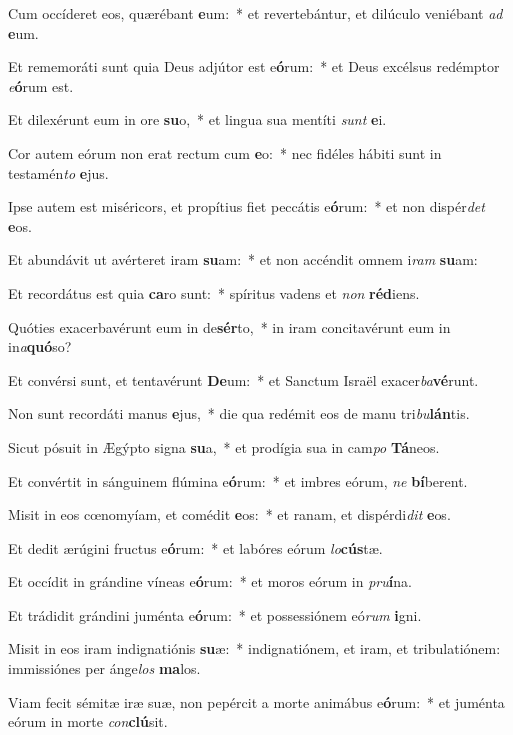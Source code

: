 \item Cum occíderet eos, quærébant \textbf{e}um:~* et revertebántur, et dilúculo veniébant \textit{ad} \textbf{e}um.
\item Et rememoráti sunt quia Deus adjútor est e\textbf{ó}rum:~* et Deus excélsus redémptor \textit{e}\textbf{ó}rum est.
\item Et dilexérunt eum in ore \textbf{su}o,~* et lingua sua mentíti \textit{sunt} \textbf{e}i.
\item Cor autem eórum non erat rectum cum \textbf{e}o:~* nec fidéles hábiti sunt in testamén\textit{to} \textbf{e}jus.
\item Ipse autem est miséricors, et propítius fiet peccátis e\textbf{ó}rum:~* et non dispér\textit{det} \textbf{e}os.
\item Et abundávit ut avérteret iram \textbf{su}am:~* et non accéndit omnem i\textit{ram} \textbf{su}am:
\item Et recordátus est quia \textbf{ca}ro sunt:~* spíritus vadens et \textit{non} \textbf{réd}iens.
\item Quóties exacerbavérunt eum in de\textbf{sér}to,~* in iram concitavérunt eum in in\textit{a}\textbf{quó}so?
\item Et convérsi sunt, et tentavérunt \textbf{De}um:~* et Sanctum Israël exacer\textit{ba}\textbf{vé}runt.
\item Non sunt recordáti manus \textbf{e}jus,~* die qua redémit eos de manu tri\textit{bu}\textbf{lán}tis.
\item Sicut pósuit in Ægýpto signa \textbf{su}a,~* et prodígia sua in cam\textit{po} \textbf{Tá}neos.
\item Et convértit in sánguinem flúmina e\textbf{ó}rum:~* et imbres eórum, \textit{ne} \textbf{bí}berent.
\item Misit in eos cœnomyíam, et comédit \textbf{e}os:~* et ranam, et dispérdi\textit{dit} \textbf{e}os.
\item Et dedit ærúgini fructus e\textbf{ó}rum:~* et labóres eórum \textit{lo}\textbf{cús}tæ.
\item Et occídit in grándine víneas e\textbf{ó}rum:~* et moros eórum in \textit{pru}\textbf{í}na.
\item Et trádidit grándini juménta e\textbf{ó}rum:~* et possessiónem eó\textit{rum} \textbf{i}gni.
\item Misit in eos iram indignatiónis \textbf{su}æ:~* indignatiónem, et iram, et tribulatiónem: immissiónes per ánge\textit{los} \textbf{ma}los.
\item Viam fecit sémitæ iræ suæ, non pepércit a morte animábus e\textbf{ó}rum:~* et juménta eórum in morte \textit{con}\textbf{clú}sit.
